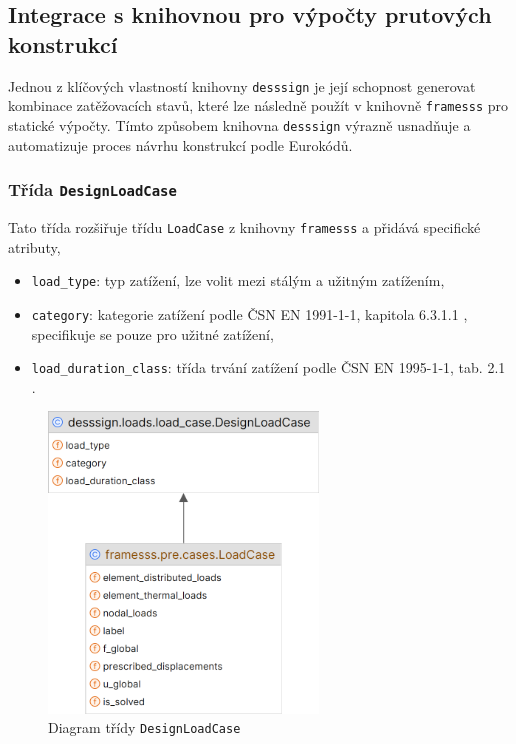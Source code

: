 \subsection{Integrace s knihovnou pro výpočty prutových konstrukcí}
Jednou z klíčových vlastností knihovny \texttt{desssign} je její schopnost generovat kombinace zatěžovacích stavů, které lze následně použít v knihovně \texttt{framesss} pro statické výpočty. Tímto způsobem knihovna \texttt{desssign} výrazně usnadňuje a automatizuje proces návrhu konstrukcí podle Eurokódů.

\subsubsection*{Třída \texttt{DesignLoadCase}}
Tato třída rozšiřuje třídu \texttt{LoadCase} z knihovny \texttt{framesss} a přidává specifické atributy, 
\begin{itemize}
    \item \texttt{load\_type}: typ zatížení, lze volit mezi stálým a užitným zatížením,
    \item \texttt{category}: kategorie zatížení podle ČSN EN 1991-1-1, kapitola 6.3.1.1 \cite{EN1991_1_1}, specifikuje se pouze pro užitné zatížení,
    \item \texttt{load\_duration\_class}: třída trvání zatížení podle ČSN EN 1995-1-1, tab. 2.1 \cite{EN1995_1_1}.
\end{itemize}

\begin{figure}[H]
    \includegraphics[height=8cm]{assets/figures/desssign/load_case.png}
    \caption{Diagram třídy \texttt{DesignLoadCase}}
    \label{fig:class_design_load_case}
\end{figure}


